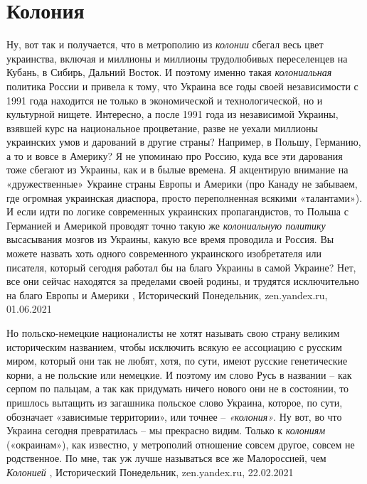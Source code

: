  
 
 
 
 
\chapter{Колония}
\label{sec:slova.kolonia}

Ну, вот так и получается, что в метрополию из \emph{колонии} сбегал весь цвет
украинства, включая и миллионы и миллионы трудолюбивых переселенцев на Кубань,
в Сибирь, Дальний Восток. И поэтому именно такая \emph{колониальная} политика России и
привела к тому, что Украина все годы своей независимости с 1991 года находится
не только в экономической и технологической, но и культурной нищете.
Интересно, а после 1991 года из независимой Украины, взявшей курс на
национальное процветание, разве не уехали миллионы украинских умов и дарований
в другие страны? Например, в Польшу, Германию, а то и вовсе в Америку? Я не
упоминаю про Россию, куда все эти дарования тоже сбегают из Украины, как и в
былые времена. Я акцентирую внимание на «дружественные» Украине страны Европы и
Америки (про Канаду не забываем, где огромная украинская диаспора, просто
переполненная всякими «талантами»). И если идти по логике современных
украинских пропагандистов, то Польша с Германией и Америкой проводят точно
такую же \emph{колониальную политику} высасывания мозгов из Украины, какую все время
проводила и Россия. Вы можете назвать хоть одного современного украинского
изобретателя или писателя, который сегодня работал бы на благо Украины в самой
Украине? Нет, все они сейчас находятся за пределами своей родины, и трудятся
исключительно на благо Европы и Америки
, 
Исторический Понедельник, zen.yandex.ru, 01.06.2021

Но польско-немецкие националисты не хотят называть свою страну великим
историческим названием, чтобы исключить всякую ее ассоциацию с русским миром,
который они так не любят, хотя, по сути, имеют русские генетические корни, а не
польские или немецкие. И поэтому им слово Русь в названии – как серпом по
пальцам, а так как придумать ничего нового они не в состоянии, то пришлось
вытащить из загашника польское слово Украина, которое, по сути, обозначает
«зависимые территории», или точнее – \emph{«колония»}.  Ну вот, во что Украина
сегодня превратилась – мы прекрасно видим. Только к \emph{колониям} («окраинам»), как
известно, у метрополий отношение совсем другое, совсем не родственное. По мне,
так уж лучше называться все же Малороссией, чем \emph{Колонией}
, 
Исторический Понедельник, zen.yandex.ru, 22.02.2021 

